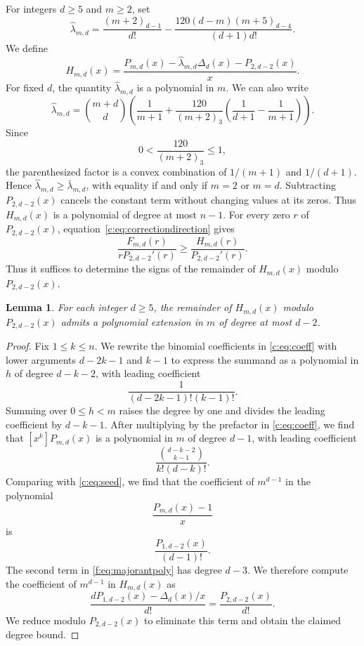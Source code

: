 \documentclass[11pt]{article}
\numberwithin{equation}{section}
\newtheorem{lemma}[theorem]{Lemma}
\theoremstyle{remark}\newtheorem{remark}[theorem]{Remark}
\begin{document}
For integers $d\ge5$ and $m\ge2$, set
\begin{equation}\label{f:eq:majorantpoly}
 \widehat\lambda_{m,d}=\frac{(m+2)_{d-1}}{d!}
       -\frac{120(d-m)(m+5)_{d-4}}{(d+1)d!}.
\end{equation}
We define
\[
 H_{m,d}(x)=\frac{P_{m,d}(x)-\widehat\lambda_{m,d}\Delta_d(x)-P_{2,d-2}(x)}x.
\]
For fixed $d$, the quantity $\widehat\lambda_{m,d}$ is a polynomial in $m$.
We can also write
\[
 \widehat\lambda_{m,d}=\binom{m+d}{d}
 \left(\frac1{m+1}+\frac{120}{(m+2)_3}
 \left(\frac1{d+1}-\frac1{m+1}\right)\right).
\]
Since
\[
 0<\frac{120}{(m+2)_3}\le1,
\]
the parenthesized factor is a convex
combination of $1/(m+1)$ and $1/(d+1)$. Hence
$\widehat\lambda_{m,d}\ge\bar\lambda_{m,d}$, with equality if and only if
$m=2$ or $m=d$.
Subtracting $P_{2,d-2}(x)$ cancels the constant term without changing values
at its zeros. Thus $H_{m,d}(x)$ is a polynomial of degree at most $n-1$. For every zero
$r$ of $P_{2,d-2}(x)$, equation~\eqref{c:eq:correctiondirection} gives
\begin{equation}\label{f:eq:uppernodes}
 \frac{F_{m,d}(r)}{rP_{2,d-2}'(r)}\ge\frac{H_{m,d}(r)}{P_{2,d-2}'(r)}.
\end{equation}
Thus it suffices to determine the signs of the remainder of
$H_{m,d}(x)$ modulo $P_{2,d-2}(x)$.
\begin{lemma}\label{f:lem:polynomial}
For each integer $d\ge5$, the remainder of $H_{m,d}(x)$ modulo
$P_{2,d-2}(x)$ admits a polynomial extension in $m$ of degree at most $d-2$.
\end{lemma}
\begin{proof}
Fix $1\le k\le n$. We rewrite the binomial coefficients in
\eqref{c:eq:coeff} with lower arguments $d-2k-1$ and $k-1$ to express
the summand as a polynomial in $h$ of degree $d-k-2$, with leading coefficient
\[
 \frac1{(d-2k-1)!(k-1)!}.
\]
Summing over $0\le h<m$ raises the degree by one and divides the leading
coefficient by $d-k-1$. After multiplying by the prefactor in
\eqref{c:eq:coeff}, we find that $[x^k]P_{m,d}(x)$ is a polynomial
in $m$ of degree $d-1$, with leading coefficient
\[
 \frac{\binom{d-k-2}{k-1}}{k!(d-k)!}.
\]
Comparing with \eqref{c:eq:seed}, we find that the coefficient of
$m^{d-1}$ in the polynomial
\[
 \frac{P_{m,d}(x)-1}x
\]
is
\[
 \frac{P_{1,d-2}(x)}{(d-1)!}.
\]
The second term in \eqref{f:eq:majorantpoly} has degree $d-3$.
We therefore compute the coefficient of
$m^{d-1}$ in $H_{m,d}(x)$ as
\[
 \frac{dP_{1,d-2}(x)-\Delta_d(x)/x}{d!}=\frac{P_{2,d-2}(x)}{d!}.
\]
We reduce modulo $P_{2,d-2}(x)$ to eliminate this term and obtain the claimed degree bound.
\end{proof}
\end{document}
